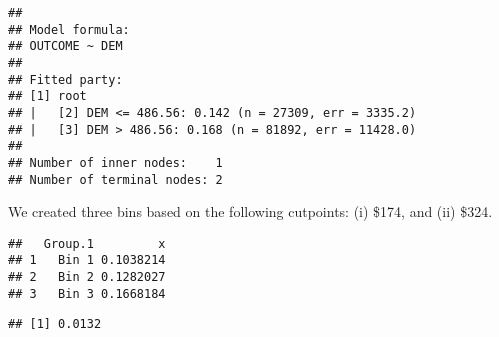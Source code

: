 \documentclass[
]{article}
\newenvironment{Shaded}{\begin{snugshade}}{\end{snugshade}}
\newcommand{\CommentTok}[1]{\textcolor[rgb]{0.56,0.35,0.01}{\textit{#1}}}
\newcommand{\DataTypeTok}[1]{\textcolor[rgb]{0.13,0.29,0.53}{#1}}
\newcommand{\KeywordTok}[1]{\textcolor[rgb]{0.13,0.29,0.53}{\textbf{#1}}}
\newcommand{\NormalTok}[1]{#1}
\newcommand{\OperatorTok}[1]{\textcolor[rgb]{0.81,0.36,0.00}{\textbf{#1}}}
\newcommand{\StringTok}[1]{\textcolor[rgb]{0.31,0.60,0.02}{#1}}
\begin{document}
\begin{verbatim}
## 
## Model formula:
## OUTCOME ~ DEM
## 
## Fitted party:
## [1] root
## |   [2] DEM <= 486.56: 0.142 (n = 27309, err = 3335.2)
## |   [3] DEM > 486.56: 0.168 (n = 81892, err = 11428.0)
## 
## Number of inner nodes:    1
## Number of terminal nodes: 2
\end{verbatim}

\begin{Shaded}
\end{Shaded}

We created three bins based on the following cutpoints: (i) \$174, and
(ii) \$324.

\begin{Shaded}
\end{Shaded}

\begin{verbatim}
##   Group.1         x
## 1   Bin 1 0.1038214
## 2   Bin 2 0.1282027
## 3   Bin 3 0.1668184
\end{verbatim}

\begin{Shaded}
\end{Shaded}

\begin{verbatim}
## [1] 0.0132
\end{verbatim}

\begin{Shaded}
\end{Shaded}
\end{document}
